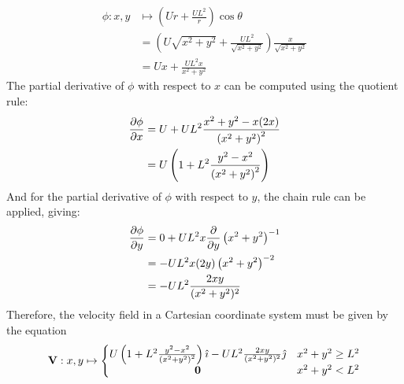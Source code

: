 \begin{align*}
    \phi:x,y&\mapsto\left(Ur+\frac{UL^2}{r}\right)\cos\theta\\
    &=\left(U\sqrt{x^2+y^2}+\frac{UL^2}{\sqrt{x^2+y^2}}\right)\frac{x}{\sqrt{x^2+y^2}}\\
    &=Ux+\frac{UL^2x}{x^2+y^2}
\end{align*}
The partial derivative of $\phi$ with respect to $x$ can be computed using the quotient rule:
\begin{align*}
    \pdv{\phi}{x}&=U+UL^2\frac{x^2+y^2-x(2x)}{\left(x^2+y^2\right)^2}\\
    &=U\left(1+L^2\frac{y^2-x^2}{\left(x^2+y^2\right)^2}\right)
\end{align*}
And for the partial derivative of $\phi$ with respect to $y$, the chain rule can be applied, giving:
\begin{align*}
    \pdv{\phi}{y}&=0+UL^2x\pdv{y}\left(x^2+y^2\right)^{-1}\\
    &=-UL^2x(2y)\left(x^2+y^2\right)^{-2}\\
    &=-UL^2\frac{2xy}{(x^2+y^2)^2}
\end{align*}
Therefore, the velocity field in a Cartesian coordinate system must be given by the equation
\begin{equation}\label{equation:VELOCITY:CARTESIAN} 
    \mathbf{V}:x,y\mapsto\left\{\begin{matrix}
        U\left(1+L^2\frac{y^2-x^2}{\left(x^2+y^2\right)^2}\right)\hat{\imath}-UL^2\frac{2xy}{(x^2+y^2)^2}\hat{\jmath}&x^2+y^2\geq L^2\\
        \mathbf{0}&x^2+y^2<L^2
    \end{matrix}\right.
\end{equation}

